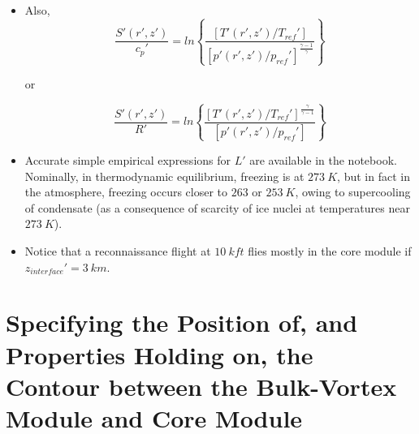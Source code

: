 \documentclass[preprint, prX]{revtex4}
\newcommand{\cbfrac}[2]{\left\{\frac{#1}{#2}\right\}}
\newcommand{\gogmo}{\frac{\gamma}{\gamma-1}}
\newcommand{\zinter}{z_{interface}}
\begin{document}
\begin{itemize}
\item Also, 
\begin{equation}
	\frac{S'(r',z')}{c_p'} = ln \cbfrac{ \left[ T'(r',z')/T_{ref}'\right] }{\left[ p'(r',z')/p_{ref}' \right]^\frac{\gamma-1}{\gamma} }
\end{equation}

or

\begin{equation}
	\frac{S'(r',z')}{R'} = ln \cbfrac{ \left[ T'(r',z')/T_{ref}'\right]^\gogmo }{\left[ p'(r',z')/p_{ref}' \right] }
\end{equation}

\item 

Accurate simple empirical expressions for $L'$ are available in the notebook. Nominally, in thermodynamic equilibrium, freezing is at $273\ \si{K}$, but in fact in the atmosphere, freezing occurs closer to $263$ or $253\ \si{K}$, owing to supercooling of condensate (as a consequence of scarcity of ice nuclei at temperatures near $273\ \si{K}$).

\item Notice that a reconnaissance flight at $10\ \si{kft}$ flies mostly in the core module if $\zinter' = 3\ \si{km}$.

\end{itemize}

\section{Specifying the Position of, and Properties Holding on, the Contour between the Bulk-Vortex Module and Core Module}

\begin{figure}[h!]
	\centering
	\def\svgwidth{0.7\columnwidth}
	
\end{figure}
\end{document}
